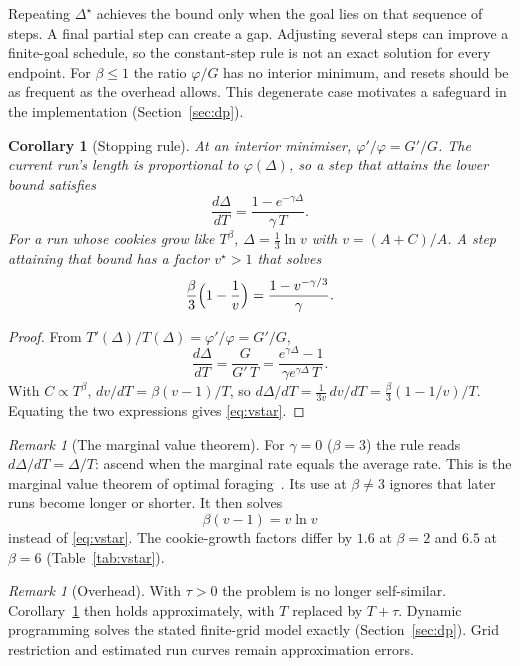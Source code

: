 \documentclass[11pt,a4paper]{article}
\numberwithin{equation}{section}
\newtheorem{corollary}[theorem]{Corollary}
\theoremstyle{definition}
\theoremstyle{remark}
\newtheorem{remark}[theorem]{Remark}
\begin{document}
Repeating $\Delta^\star$ achieves the bound only when the goal lies on that sequence of steps. A final partial step can create a gap. Adjusting several steps can improve a finite-goal schedule, so the constant-step rule is not an exact solution for every endpoint. For $\beta\le1$ the ratio $\varphi/G$ has no interior minimum, and resets should be as frequent as the overhead allows. This degenerate case motivates a safeguard in the implementation (Section~\ref{sec:dp}).

\begin{corollary}[Stopping rule]\label{cor:stop}
At an interior minimiser, $\varphi'/\varphi=G'/G$. The current run's length is proportional to $\varphi(\Delta)$, so a step that attains the lower bound satisfies
\begin{equation}\label{eq:stop-rate}
 \frac{d\Delta}{dT}=\frac{1-e^{-\gamma\Delta}}{\gamma\,T}.
\end{equation}
For a run whose cookies grow like $T^\beta$, $\Delta=\tfrac13\ln v$ with $v=(A+C)/A$. A step attaining that bound has a factor $v^\star>1$ that solves
\begin{equation}\label{eq:vstar}
 \frac\beta3\Bigl(1-\frac1v\Bigr)=\frac{1-v^{-\gamma/3}}\gamma.
\end{equation}
\end{corollary}

\begin{proof}
From $T'(\Delta)/T(\Delta)=\varphi'/\varphi=G'/G$,
\[
 \frac{d\Delta}{dT}=\frac G{G'\,T}=\frac{e^{\gamma\Delta}-1}{\gamma e^{\gamma\Delta}\,T}.
\]
With $C\propto T^\beta$, $dv/dT=\beta(v-1)/T$, so $d\Delta/dT=\tfrac1{3v}\,dv/dT=\tfrac\beta3(1-1/v)/T$. Equating the two expressions gives \eqref{eq:vstar}.
\end{proof}

\begin{remark}[The marginal value theorem]\label{rem:mvt}
For $\gamma=0$ ($\beta=3$) the rule reads $d\Delta/dT=\Delta/T$: ascend when the marginal rate equals the average rate. This is the marginal value theorem of optimal foraging~\cite{charnov}. Its use at $\beta\ne3$ ignores that later runs become longer or shorter. It then solves
\[
 \beta(v-1)=v\ln v
\]
instead of \eqref{eq:vstar}. The cookie-growth factors differ by $1.6$ at $\beta=2$ and $6.5$ at $\beta=6$ (Table~\ref{tab:vstar}).
\end{remark}

\begin{remark}[Overhead]\label{rem:overhead}
With $\tau>0$ the problem is no longer self-similar. Corollary~\ref{cor:stop} then holds approximately, with $T$ replaced by $T+\tau$. Dynamic programming solves the stated finite-grid model exactly (Section~\ref{sec:dp}). Grid restriction and estimated run curves remain approximation errors.
\end{remark}
\end{document}

